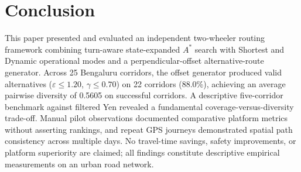 \documentclass[11pt,conference]{IEEEtran}
\begin{document}

\section{Conclusion}

This paper presented and evaluated an independent two-wheeler routing framework combining turn-aware state-expanded $A^*$ search with Shortest and Dynamic operational modes and a perpendicular-offset alternative-route generator.
Across 25 Bengaluru corridors, the offset generator produced valid alternatives ($\varepsilon \le 1.20$, $\gamma \le 0.70$) on 22 corridors (88.0\%), achieving an average pairwise diversity of 0.5605 on successful corridors.
A descriptive five-corridor benchmark against filtered Yen revealed a fundamental coverage-versus-diversity trade-off.
Manual pilot observations documented comparative platform metrics without asserting rankings, and repeat GPS journeys demonstrated spatial path consistency across multiple days.
No travel-time savings, safety improvements, or platform superiority are claimed; all findings constitute descriptive empirical measurements on an urban road network.

\balance


\end{document}

